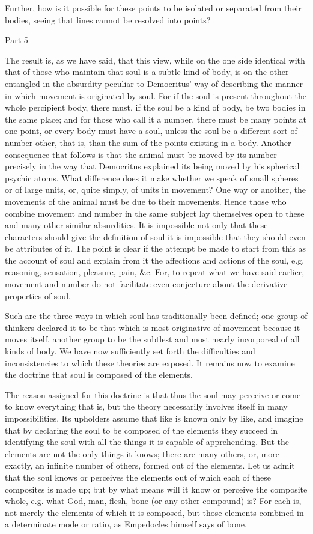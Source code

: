 Further, how is it possible for these points to be isolated or separated
from their bodies, seeing that lines cannot be resolved into points?

Part 5

The result is, as we have said, that this view, while on the one side
identical with that of those who maintain that soul is a subtle kind
of body, is on the other entangled in the absurdity peculiar to Democritus'
way of describing the manner in which movement is originated by soul.
For if the soul is present throughout the whole percipient body, there
must, if the soul be a kind of body, be two bodies in the same place;
and for those who call it a number, there must be many points at one
point, or every body must have a soul, unless the soul be a different
sort of number-other, that is, than the sum of the points existing
in a body. Another consequence that follows is that the animal must
be moved by its number precisely in the way that Democritus explained
its being moved by his spherical psychic atoms. What difference does
it make whether we speak of small spheres or of large units, or, quite
simply, of units in movement? One way or another, the movements of
the animal must be due to their movements. Hence those who combine
movement and number in the same subject lay themselves open to these
and many other similar absurdities. It is impossible not only that
these characters should give the definition of soul-it is impossible
that they should even be attributes of it. The point is clear if the
attempt be made to start from this as the account of soul and explain
from it the affections and actions of the soul, e.g. reasoning, sensation,
pleasure, pain, &c. For, to repeat what we have said earlier, movement
and number do not facilitate even conjecture about the derivative
properties of soul. 

Such are the three ways in which soul has traditionally been defined;
one group of thinkers declared it to be that which is most originative
of movement because it moves itself, another group to be the subtlest
and most nearly incorporeal of all kinds of body. We have now sufficiently
set forth the difficulties and inconsistencies to which these theories
are exposed. It remains now to examine the doctrine that soul is composed
of the elements. 

The reason assigned for this doctrine is that thus the soul may perceive
or come to know everything that is, but the theory necessarily involves
itself in many impossibilities. Its upholders assume that like is
known only by like, and imagine that by declaring the soul to be composed
of the elements they succeed in identifying the soul with all the
things it is capable of apprehending. But the elements are not the
only things it knows; there are many others, or, more exactly, an
infinite number of others, formed out of the elements. Let us admit
that the soul knows or perceives the elements out of which each of
these composites is made up; but by what means will it know or perceive
the composite whole, e.g. what God, man, flesh, bone (or any other
compound) is? For each is, not merely the elements of which it is
composed, but those elements combined in a determinate mode or ratio,
as Empedocles himself says of bone, 

